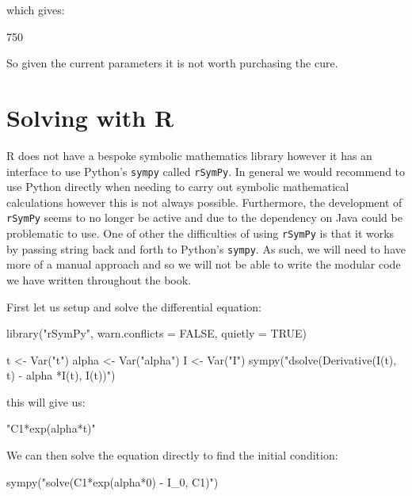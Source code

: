 which gives:

\begin{pyout}
750
\end{pyout}

So given the current parameters it is not worth purchasing the cure.

\section{Solving with R}\label{sec:solving-with-R}

R does not have a bespoke symbolic mathematics library however it has an
interface to use Python's \texttt{sympy} called
\texttt{rSymPy}. In general we would recommend to use Python directly
when needing to carry out symbolic mathematical calculations however this is not
always possible. Furthermore, the development of \texttt{rSymPy} seems to
no longer be active and due to the dependency on Java could be problematic to
use.
One of other the difficulties of using \texttt{rSymPy}
is that it works by passing string back and forth to Python's
\texttt{sympy}. As such, we will need to have more of a manual
approach and so we will not be able to write the modular code we have written
throughout the book.

First let us setup and solve the differential equation:

\begin{Rin-no-test}
library("rSymPy", warn.conflicts = FALSE, quietly = TRUE)

t <- Var("t")
alpha <- Var("alpha")
I <- Var("I")
sympy("dsolve(Derivative(I(t), t) - alpha *I(t), I(t))")
\end{Rin-no-test}

this will give us:

\begin{Rout-no-test}
[1] "C1*exp(alpha*t)"
\end{Rout-no-test}

We can then solve the equation directly to find the initial condition:

\begin{Rin-no-test}
sympy("solve(C1*exp(alpha*0) - I_0, C1)")
\end{Rin-no-test}

